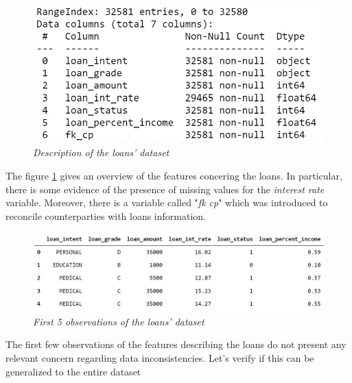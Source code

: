 \documentclass[a4paper,12pt]{article}
\begin{document}
        \begin{figure}[H]
            \centerline{
                \includegraphics[width=\linewidth]{./images/loans_dataset_info.jpg}
            }
            \caption{\textit{Description of the loans' dataset}}
            \label{fig:loans_info}
         \end{figure}

     The figure \ref{fig:loans_info} gives an overview of the features concering the loans. In particular,
     there is some evidence of the presence of missing values for the \textit{interest rate} variable.
     Moreover, there is a variable called "\textit{fk cp}" which was introduced to reconcile counterparties with loans information.
 
        \begin{figure}[H]
            \centerline{
                \includegraphics[width=\linewidth]{./images/loans_dataset_head.jpg}
            }
            \caption{\textit{First 5 observations of the loans' dataset}}
            \label{fig:loans_head}
        \end{figure}

     The first few observations of the features describing the loans do not present any relevant concern regarding 
     data inconsistencies. Let's verify if this can be generalized to the entire dataset
     
\end{document}
